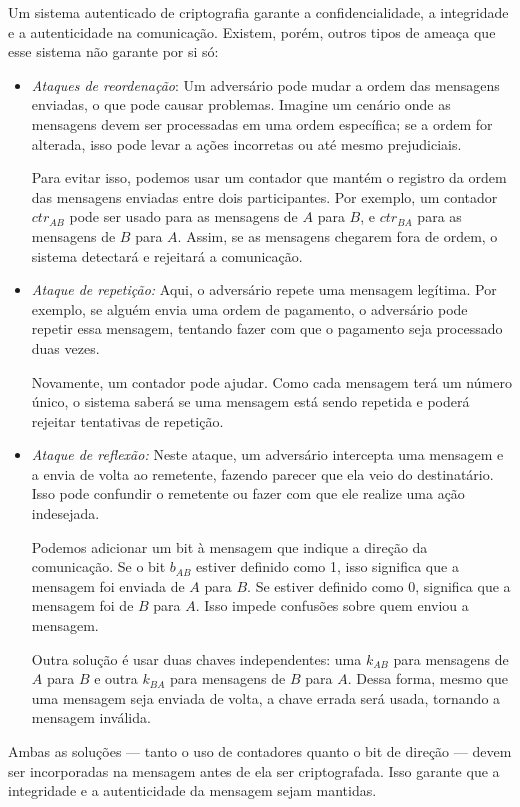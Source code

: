 Um sistema autenticado de criptografia garante a confidencialidade, a integridade e a autenticidade na comunicação.
Existem, porém, outros tipos de ameaça que esse sistema não garante por si só:
\begin{itemize}
\item {\em Ataques de reordenação}:
  Um adversário pode mudar a ordem das mensagens enviadas, o que pode causar problemas.
  Imagine um cenário onde as mensagens devem ser processadas em uma ordem específica;
  se a ordem for alterada, isso pode levar a ações incorretas ou até mesmo prejudiciais.

  Para evitar isso, podemos usar um contador que mantém o registro da ordem das mensagens enviadas entre dois participantes.
  Por exemplo, um contador $ctr_{AB}$ pode ser usado para as mensagens de $A$ para $B$, e $ctr_{BA}$ para as mensagens de $B$ para $A$.
  Assim, se as mensagens chegarem fora de ordem, o sistema detectará e rejeitará a comunicação.
\item {\em Ataque de repetição:}
  Aqui, o adversário repete uma mensagem legítima.
  Por exemplo, se alguém envia uma ordem de pagamento, o adversário pode repetir essa mensagem, tentando fazer com que o pagamento seja processado duas vezes.

  Novamente, um contador pode ajudar.
  Como cada mensagem terá um número único, o sistema saberá se uma mensagem está sendo repetida e poderá rejeitar tentativas de repetição.
\item {\em Ataque de reflexão:}
  Neste ataque, um adversário intercepta uma mensagem e a envia de volta ao remetente, fazendo parecer que ela veio do destinatário.
  Isso pode confundir o remetente ou fazer com que ele realize uma ação indesejada.

  Podemos adicionar um bit à mensagem que indique a direção da comunicação.
  Se o bit $b_{AB}$ estiver definido como 1, isso significa que a mensagem foi enviada de $A$ para $B$.
  Se estiver definido como 0, significa que a mensagem foi de $B$ para $A$.
  Isso impede confusões sobre quem enviou a mensagem.

  Outra solução é usar duas chaves independentes:
  uma $k_{AB}$ para mensagens de $A$ para $B$ e outra $k_{BA}$ para mensagens de $B$ para $A$.
  Dessa forma, mesmo que uma mensagem seja enviada de volta, a chave errada será usada, tornando a mensagem inválida.
\end{itemize}

Ambas as soluções — tanto o uso de contadores quanto o bit de direção — devem ser incorporadas na mensagem antes de ela ser criptografada.
Isso garante que a integridade e a autenticidade da mensagem sejam mantidas.

